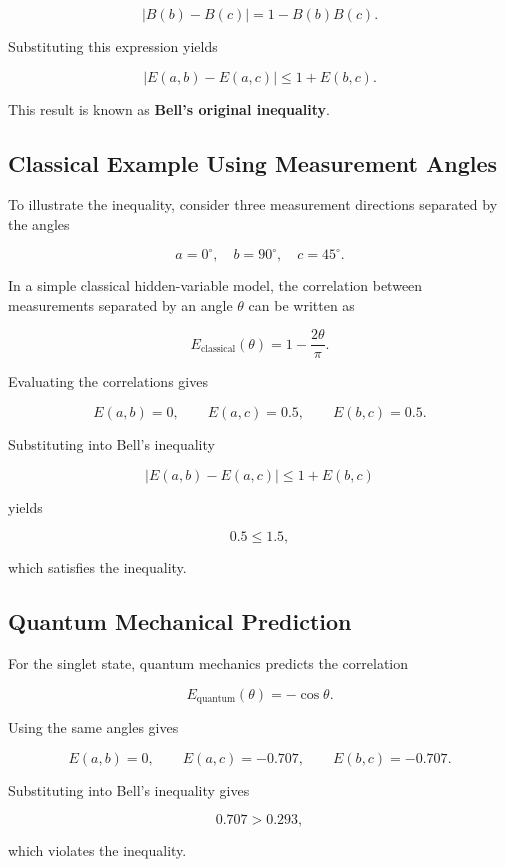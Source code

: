 \documentclass[14pt,a4paper]{extarticle}
\begin{document}
\[
|B(b) - B(c)| = 1 - B(b)B(c).
\]

Substituting this expression yields

\[
|E(a,b) - E(a,c)| \le 1 + E(b,c).
\]

This result is known as \textbf{Bell’s original inequality}.


\subsection{Classical Example Using Measurement Angles}

To illustrate the inequality, consider three measurement directions separated by the angles

\[
a = 0^\circ, \quad b = 90^\circ, \quad c = 45^\circ.
\]

In a simple classical hidden-variable model, the correlation between measurements separated by an angle $\theta$ can be written as

\[
E_{\text{classical}}(\theta) = 1 - \frac{2\theta}{\pi}.
\]

Evaluating the correlations gives

\[
E(a,b) = 0, \qquad E(a,c) = 0.5, \qquad E(b,c) = 0.5.
\]

Substituting into Bell’s inequality

\[
|E(a,b) - E(a,c)| \le 1 + E(b,c)
\]

yields

\[
0.5 \le 1.5,
\]

which satisfies the inequality.


\subsection{Quantum Mechanical Prediction}

For the singlet state, quantum mechanics predicts the correlation

\[
E_{\text{quantum}}(\theta) = -\cos \theta.
\]

Using the same angles gives

\[
E(a,b) = 0, \qquad
E(a,c) = -0.707, \qquad
E(b,c) = -0.707.
\]

Substituting into Bell’s inequality gives

\[
0.707 > 0.293,
\]

which violates the inequality.
\end{document}
